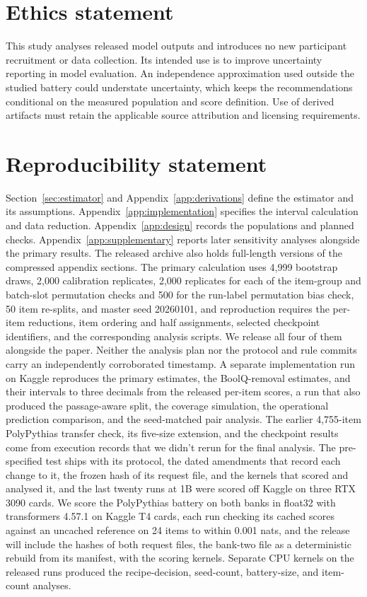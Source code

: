 \section*{Ethics statement}
This study analyses released model outputs and introduces no new participant recruitment or data collection. Its intended use is to improve uncertainty reporting in model evaluation. An independence approximation used outside the studied battery could understate uncertainty, which keeps the recommendations conditional on the measured population and score definition. Use of derived artifacts must retain the applicable source attribution and licensing requirements.

\section*{Reproducibility statement}
Section~\ref{sec:estimator} and Appendix~\ref{app:derivations} define the estimator and its assumptions. Appendix~\ref{app:implementation} specifies the interval calculation and data reduction. Appendix~\ref{app:design} records the populations and planned checks. Appendix~\ref{app:supplementary} reports later sensitivity analyses alongside the primary results. The released archive also holds full-length versions of the compressed appendix sections. The primary calculation uses 4,999 bootstrap draws, 2,000 calibration replicates, 2,000 replicates for each of the item-group and batch-slot permutation checks and 500 for the run-label permutation bias check, 50 item re-splits, and master seed 20260101, and reproduction requires the per-item reductions, item ordering and half assignments, selected checkpoint identifiers, and the corresponding analysis scripts. We release all four of them alongside the paper. Neither the analysis plan nor the protocol and rule commits carry an independently corroborated timestamp. A separate implementation run on Kaggle reproduces the primary estimates, the BoolQ-removal estimates, and their intervals to three decimals from the released per-item scores, a run that also produced the passage-aware split, the coverage simulation, the operational prediction comparison, and the seed-matched pair analysis. The earlier 4,755-item PolyPythias transfer check, its five-size extension, and the checkpoint results come from execution records that we didn't rerun for the final analysis. The pre-specified test ships with its protocol, the dated amendments that record each change to it, the frozen hash of its request file, and the kernels that scored and analysed it, and the last twenty runs at 1B were scored off Kaggle on three RTX 3090 cards. We score the PolyPythias battery on both banks in float32 with transformers 4.57.1 on Kaggle T4 cards, each run checking its cached scores against an uncached reference on 24 items to within 0.001 nats, and the release will include the hashes of both request files, the bank-two file as a deterministic rebuild from its manifest, with the scoring kernels. Separate CPU kernels on the released runs produced the recipe-decision, seed-count, battery-size, and item-count analyses.

